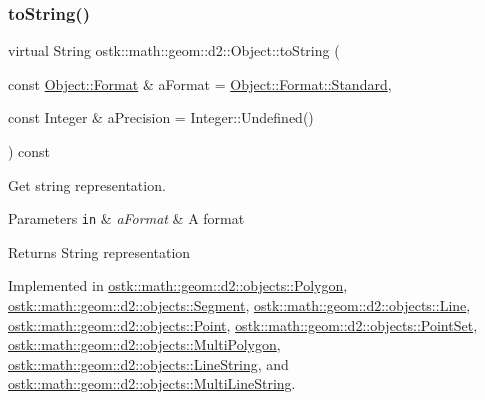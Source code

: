 \subsubsection{\texorpdfstring{to\+String()}{toString()}}
{\footnotesize\ttfamily virtual String ostk\+::math\+::geom\+::d2\+::\+Object\+::to\+String (\begin{DoxyParamCaption}\item[{const \hyperlink{classostk_1_1math_1_1geom_1_1d2_1_1_object_aa76f9e30caebf4005bafbdff447f66cf}{Object\+::\+Format} \&}]{a\+Format = {\ttfamily \hyperlink{classostk_1_1math_1_1geom_1_1d2_1_1_object_aa76f9e30caebf4005bafbdff447f66cfaeb6d8ae6f20283755b339c0dc273988b}{Object\+::\+Format\+::\+Standard}},  }\item[{const Integer \&}]{a\+Precision = {\ttfamily Integer\+:\+:Undefined()} }\end{DoxyParamCaption}) const\hspace{0.3cm}{\ttfamily [pure virtual]}}



Get string representation. 


\begin{DoxyParams}[1]{Parameters}
\mbox{\tt in}  & {\em a\+Format} & A format \\
\hline
\end{DoxyParams}
\begin{DoxyReturn}{Returns}
String representation 
\end{DoxyReturn}


Implemented in \hyperlink{classostk_1_1math_1_1geom_1_1d2_1_1objects_1_1_polygon_a6e672ccf5f1101de80e636f097f0a0f7}{ostk\+::math\+::geom\+::d2\+::objects\+::\+Polygon}, \hyperlink{classostk_1_1math_1_1geom_1_1d2_1_1objects_1_1_segment_ac302430065e10f1f281bb8782a904673}{ostk\+::math\+::geom\+::d2\+::objects\+::\+Segment}, \hyperlink{classostk_1_1math_1_1geom_1_1d2_1_1objects_1_1_line_a8b7e13b51e64b9db157ee08a5310646f}{ostk\+::math\+::geom\+::d2\+::objects\+::\+Line}, \hyperlink{classostk_1_1math_1_1geom_1_1d2_1_1objects_1_1_point_ac8fdaee79af60e2972257e43ff175f12}{ostk\+::math\+::geom\+::d2\+::objects\+::\+Point}, \hyperlink{classostk_1_1math_1_1geom_1_1d2_1_1objects_1_1_point_set_af032e86d9d9dcabe229a015a8361daf2}{ostk\+::math\+::geom\+::d2\+::objects\+::\+Point\+Set}, \hyperlink{classostk_1_1math_1_1geom_1_1d2_1_1objects_1_1_multi_polygon_abf52343dc62ec2d62d971bef636f6c1c}{ostk\+::math\+::geom\+::d2\+::objects\+::\+Multi\+Polygon}, \hyperlink{classostk_1_1math_1_1geom_1_1d2_1_1objects_1_1_line_string_a5312030bced48de68f8902bb6581461d}{ostk\+::math\+::geom\+::d2\+::objects\+::\+Line\+String}, and \hyperlink{classostk_1_1math_1_1geom_1_1d2_1_1objects_1_1_multi_line_string_a87df673d41e16eb2b196c8b8a852d71f}{ostk\+::math\+::geom\+::d2\+::objects\+::\+Multi\+Line\+String}.



